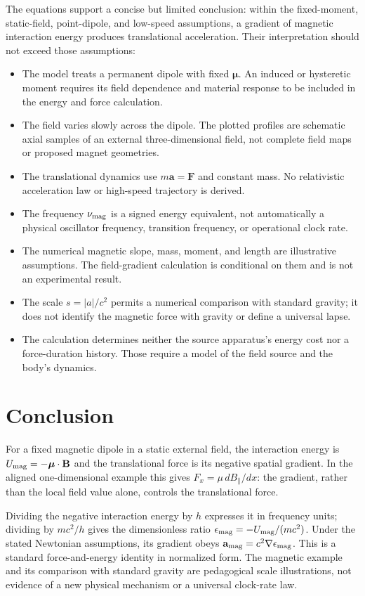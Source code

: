 \documentclass[12pt]{article}
\begin{document}
The equations support a concise but limited conclusion: within the fixed-moment, static-field, point-dipole, and low-speed assumptions, a gradient of magnetic interaction energy produces translational acceleration. Their interpretation should not exceed those assumptions:
\begin{itemize}[leftmargin=*]
  \item The model treats a permanent dipole with fixed $\boldsymbol{\mu}$. An induced or hysteretic moment requires its field dependence and material response to be included in the energy and force calculation.
  \item The field varies slowly across the dipole. The plotted profiles are schematic axial samples of an external three-dimensional field, not complete field maps or proposed magnet geometries.
  \item The translational dynamics use $m\mathbf a=\mathbf F$ and constant mass. No relativistic acceleration law or high-speed trajectory is derived.
  \item The frequency $\nu_{\rm mag}$ is a signed energy equivalent, not automatically a physical oscillator frequency, transition frequency, or operational clock rate.
  \item The numerical magnetic slope, mass, moment, and length are illustrative assumptions. The field-gradient calculation is conditional on them and is not an experimental result.
  \item The scale $s=|a|/c^2$ permits a numerical comparison with standard gravity; it does not identify the magnetic force with gravity or define a universal lapse.
  \item The calculation determines neither the source apparatus's energy cost nor a force-duration history. Those require a model of the field source and the body's dynamics.
\end{itemize}

\section{Conclusion}

For a fixed magnetic dipole in a static external field, the interaction energy is $U_{\rm mag}=-\boldsymbol{\mu}\cdot\mathbf B$ and the translational force is its negative spatial gradient. In the aligned one-dimensional example this gives $F_x=\mu\,dB_{\parallel}/dx$: the gradient, rather than the local field value alone, controls the translational force.

Dividing the negative interaction energy by $h$ expresses it in frequency units; dividing by $mc^2/h$ gives the dimensionless ratio $\epsilon_{\rm mag}=-U_{\rm mag}/(mc^2)$. Under the stated Newtonian assumptions, its gradient obeys $\mathbf a_{\rm mag}=c^2\nabla\epsilon_{\rm mag}$. This is a standard force-and-energy identity in normalized form. The magnetic example and its comparison with standard gravity are pedagogical scale illustrations, not evidence of a new physical mechanism or a universal clock-rate law.
\end{document}
